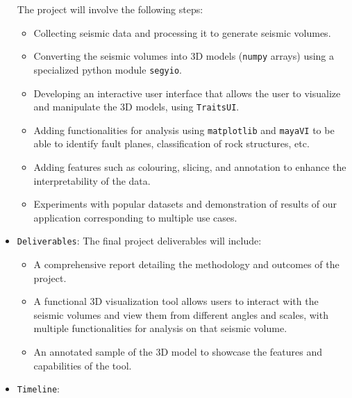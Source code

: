 \documentclass[11pt,a4paper]{article}
\begin{document}
\begin{itemize}
    The project will involve the following steps:
    \begin{itemize}
        \item Collecting seismic data and processing it to generate seismic volumes.
        \item Converting the seismic volumes into 3D models (\verb!numpy! arrays) using a specialized python module \verb!segyio!.
        \item Developing an interactive user interface that allows the user to visualize and manipulate the 3D models, using \verb!TraitsUI!.
        \item Adding functionalities for analysis using \verb!matplotlib! and \verb!mayaVI! to be able to identify fault planes, classification of rock structures, etc.
        \item Adding features such as colouring, slicing, and annotation to enhance the interpretability of the data.
        \item Experiments with popular datasets and demonstration of results of our application corresponding to multiple use cases.
    \end{itemize}

    \item \texttt{Deliverables}:
    The final project deliverables will include:
    \begin{itemize}
        \item A comprehensive report detailing the methodology and outcomes of the project.
        \item A functional 3D visualization tool allows users to interact with the seismic volumes and view them from different angles and scales, with multiple functionalities for analysis on that seismic volume.
        \item An annotated sample of the 3D model to showcase the features and capabilities of the tool.
    \end{itemize}
    \item \texttt{Timeline}:


\end{itemize}
\end{document}
